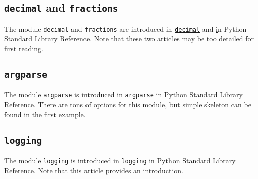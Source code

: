 \documentclass[english]{../TeXTemplate/pkupaper}
\begin{document}
\subsection{\texttt{decimal} and \texttt{fractions}}

The module \verb"decimal" and \verb"fractions" are introduced in \href{https://docs.python.org/3/library/decimal.html}{\texttt{decimal}} and \href{https://docs.python.org/3/library/fractions.html} in Python Standard Library Reference. Note that these two articles may be too detailed for first reading.

\subsection{\texttt{argparse}}

The module \verb"argparse" is introduced in \href{https://docs.python.org/3/library/argparse.html}{\texttt{argparse}} in Python Standard Library Reference. There are tons of options for this module, but simple skeleton can be found in the first example.

\subsection{\texttt{logging}}

The module \verb"logging" is introduced in \href{https://docs.python.org/3/library/logging.html}{\texttt{logging}} in Python Standard Library Reference. Note that \href{http://python.jobbole.com/86887/}{this article} provides an introduction.
\end{document}
